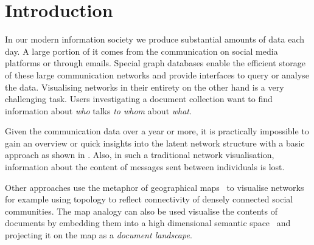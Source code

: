 \section{Introduction}


In our modern information society we produce substantial amounts of data each day.
A large portion of it comes from the communication on social media platforms or through emails.
Special graph databases enable the efficient storage of these large communication networks and provide interfaces to query or analyse the data.
Visualising networks in their entirety on the other hand is a very challenging task.
Users investigating a document collection want to find information about \textit{who} talks \textit{to whom} about \textit{what}.

Given the communication data over a year or more, it is practically impossible to gain an overview or quick insights into the latent network structure with a basic approach as shown in .
Also, in such a traditional network visualisation, information about the content of messages sent between individuals is lost.

Other approaches use the metaphor of geographical maps~\cite{pang2017creating} to visualise networks for example using topology to reflect connectivity of densely connected social communities.
The map analogy can also be used visualise the contents of documents by embedding them into a high dimensional semantic space~\cite{le2014distributed} and projecting it on the map as a \textit{document landscape}.

